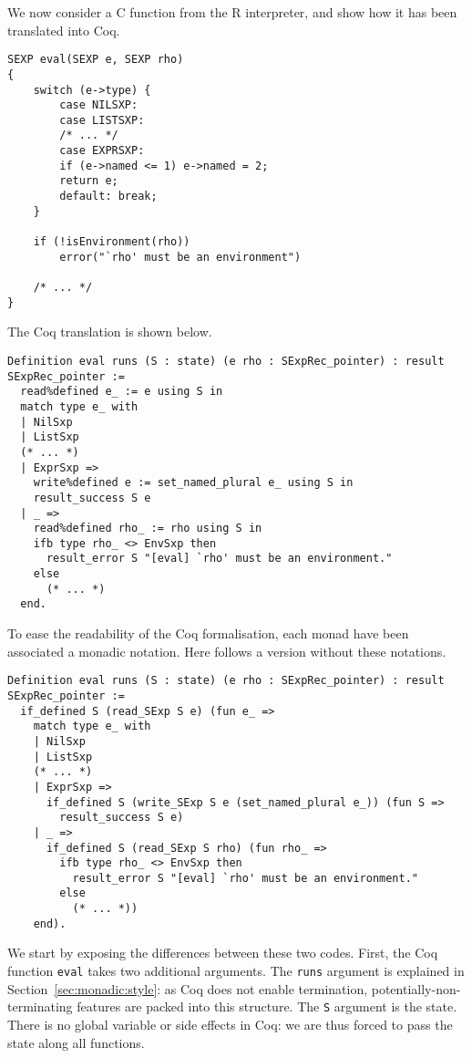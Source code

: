 \documentclass{article}
\newcommand\Coq{Coq}
\newcommand\R{R}
\newcommand\Cn{C}
\begin{document}
We now consider a \Cn{} function from the \R{} interpreter,
and show how it has been translated into \Coq{}.
\begin{verbatim}
SEXP eval(SEXP e, SEXP rho)
{
    switch (e->type) {
        case NILSXP:
        case LISTSXP:
        /* ... */
        case EXPRSXP:
        if (e->named <= 1) e->named = 2;
        return e;
        default: break;
    }

    if (!isEnvironment(rho))
        error("`rho' must be an environment")

    /* ... */
}
\end{verbatim}
The \Coq{} translation is shown below.
\begin{verbatim}
Definition eval runs (S : state) (e rho : SExpRec_pointer) : result SExpRec_pointer :=
  read%defined e_ := e using S in
  match type e_ with
  | NilSxp
  | ListSxp
  (* ... *)
  | ExprSxp =>
    write%defined e := set_named_plural e_ using S in
    result_success S e
  | _ =>
    read%defined rho_ := rho using S in
    ifb type rho_ <> EnvSxp then
      result_error S "[eval] `rho' must be an environment."
    else
      (* ... *)
  end.
\end{verbatim}
To ease the readability of the \Coq{} formalisation,
each monad have been associated a monadic notation.
Here follows a version without these notations.
\begin{verbatim}
Definition eval runs (S : state) (e rho : SExpRec_pointer) : result SExpRec_pointer :=
  if_defined S (read_SExp S e) (fun e_ =>
    match type e_ with
    | NilSxp
    | ListSxp
    (* ... *)
    | ExprSxp =>
      if_defined S (write_SExp S e (set_named_plural e_)) (fun S =>
        result_success S e)
    | _ =>
      if_defined S (read_SExp S rho) (fun rho_ =>
        ifb type rho_ <> EnvSxp then
          result_error S "[eval] `rho' must be an environment."
        else
          (* ... *))
    end).
\end{verbatim}
We start by exposing the differences between these two codes.
First, the \Coq{} function \texttt{eval} takes two additional arguments.
The \texttt{runs} argument is explained in Section~\ref{sec:monadic:style}:
as \Coq{} does not enable termination, potentially-non-terminating features
are packed into this structure.
The \texttt{S} argument is the state.
There is no global variable or side effects in \Coq{}:
we are thus forced to pass the state along all functions.
\end{document}
